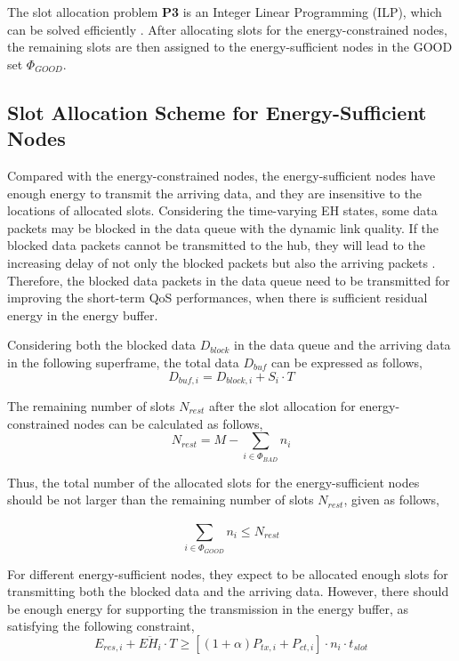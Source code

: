 \documentclass[journal,10pt]{IEEEtran}
\begin{document}
The slot allocation problem \textbf{P3} is an Integer Linear Programming (ILP), which can be solved efficiently \cite{boyd2004convex}. After allocating slots for the energy-constrained nodes, the remaining slots are then assigned to the energy-sufficient nodes in the GOOD set ${\Phi _{GOOD}}$.

\subsection{Slot Allocation Scheme for Energy-Sufficient Nodes}

Compared with the energy-constrained nodes, the energy-sufficient nodes have enough energy to transmit the arriving data, and they are insensitive to the locations of allocated slots. 
Considering the time-varying EH states, some data packets may be blocked in the data queue with the dynamic link quality. If the blocked data packets cannot be transmitted to the hub, they will lead to the increasing delay of not only the blocked packets but also the arriving packets \cite{liu2017buffer}. Therefore, the blocked data packets in the data queue need to be transmitted for improving the short-term QoS performances, when there is sufficient residual energy in the energy buffer. 

Considering both the blocked data ${D_{block}}$ in the data queue and the arriving data in the following superframe, the total data ${D_{buf}}$ can be expressed as follows,
\begin{equation}
{D_{buf,i}} = {D_{block,i}} + {S_i} \cdot T
\end{equation}

The remaining number of slots ${N_{rest}}$ after the slot allocation for energy-constrained nodes can be calculated as follows,
\begin{equation}
{{N_{rest}} = M - \sum\limits_{i \in {\Phi _{BAD}}} {{n_i}}}
\end{equation}

Thus, the total number of the allocated slots for the energy-sufficient nodes should be not larger than the remaining number of slots ${N_{rest}}$, given as follows,

\begin{equation}
\sum\limits_{i \in {\Phi _{GOOD}}}^{} {{n_i} \leqslant {N_{rest}}}
\end{equation}

For different energy-sufficient nodes, they expect to be allocated enough slots for transmitting both the blocked data and the arriving data. However, there should be enough energy for supporting the transmission in the energy buffer, as satisfying the following constraint,
\begin{equation}
{{E_{res,i}} + \overline {E{H_i}}  \cdot T \geqslant \left[ {\left( {1 + \alpha } \right){P_{tx,i}} + {P_{ct,i}}} \right] \cdot {n_i} \cdot {t_{slot}}}
\end{equation}
\end{document}
